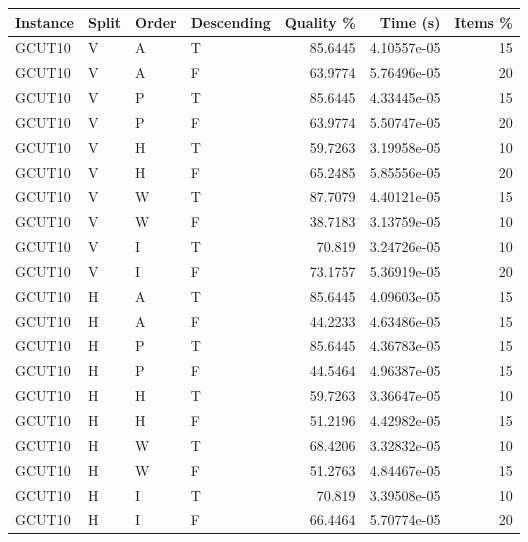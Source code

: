 \begin{tabular}{llllrrr}
    \hline
    Instance & Split & Order & Descending & Quality \% & Time (s)    & Items \% \\
    \hline
    GCUT10   & V     & A     & T          & 85.6445    & 4.10557e-05 & 15       \\
    GCUT10   & V     & A     & F          & 63.9774    & 5.76496e-05 & 20       \\
    GCUT10   & V     & P     & T          & 85.6445    & 4.33445e-05 & 15       \\
    GCUT10   & V     & P     & F          & 63.9774    & 5.50747e-05 & 20       \\
    GCUT10   & V     & H     & T          & 59.7263    & 3.19958e-05 & 10       \\
    GCUT10   & V     & H     & F          & 65.2485    & 5.85556e-05 & 20       \\
    GCUT10   & V     & W     & T          & 87.7079    & 4.40121e-05 & 15       \\
    GCUT10   & V     & W     & F          & 38.7183    & 3.13759e-05 & 10       \\
    GCUT10   & V     & I     & T          & 70.819     & 3.24726e-05 & 10       \\
    GCUT10   & V     & I     & F          & 73.1757    & 5.36919e-05 & 20       \\
    GCUT10   & H     & A     & T          & 85.6445    & 4.09603e-05 & 15       \\
    GCUT10   & H     & A     & F          & 44.2233    & 4.63486e-05 & 15       \\
    GCUT10   & H     & P     & T          & 85.6445    & 4.36783e-05 & 15       \\
    GCUT10   & H     & P     & F          & 44.5464    & 4.96387e-05 & 15       \\
    GCUT10   & H     & H     & T          & 59.7263    & 3.36647e-05 & 10       \\
    GCUT10   & H     & H     & F          & 51.2196    & 4.42982e-05 & 15       \\
    GCUT10   & H     & W     & T          & 68.4206    & 3.32832e-05 & 10       \\
    GCUT10   & H     & W     & F          & 51.2763    & 4.84467e-05 & 15       \\
    GCUT10   & H     & I     & T          & 70.819     & 3.39508e-05 & 10       \\
    GCUT10   & H     & I     & F          & 66.4464    & 5.70774e-05 & 20       \\

\end{tabular}
